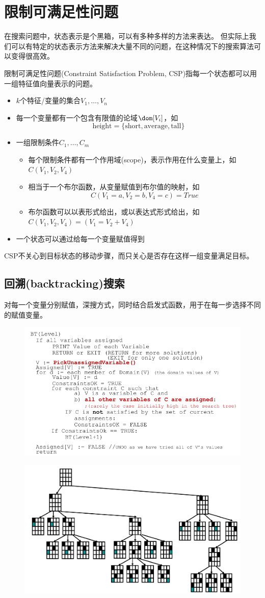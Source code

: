 
\section{限制可满足性问题}
在搜索问题中，状态表示是个黑箱，可以有多种多样的方法来表达。
但实际上我们可以有特定的状态表示方法来解决大量不同的问题，在这种情况下的搜索算法可以变得很高效。

限制可满足性问题(Constraint Satisfaction Problem, CSP)指每一个状态都可以用一组特征值向量表示的问题。
\begin{itemize}
	\item $k$个特征/变量的集合$V_1,\ldots,V_n$
	\item 每一个变量都有一个包含有限值的论域$\dom[V_i]$，如
	\[\text{height}=\{\text{short},\text{average},\text{tall}\}\]
	\item 一组限制条件$C_1,\ldots,C_m$
	\begin{itemize}
		\item 每个限制条件都有一个作用域(scope)，表示作用在什么变量上，如$C(V_1,V_2,V_4)$
		\item 相当于一个布尔函数，从变量赋值到布尔值的映射，如
		\[C(V_1=a,V_2=b,V_4=c)=True\]
		\item 布尔函数可以以表形式给出，或以表达式形式给出，如$C(V_1,V_2,V_4)=(V_1=V_2+V_4)$
	\end{itemize}
	\item 一个状态可以通过给每一个变量赋值得到
\end{itemize}

CSP不关心到目标状态的移动步骤，而只关心是否存在这样一组变量满足目标。

\subsection{回溯(backtracking)搜索}
对每一个变量分别赋值，深搜方式，同时结合启发式函数，用于在每一步选择不同的赋值变量。
\begin{figure}[H]
\centering
\includegraphics[width=0.6\linewidth]{fig/backtracking.png}
\end{figure}
\begin{figure}[H]
\centering
\includegraphics[width=0.6\linewidth]{fig/backtracking_eg.png}
\end{figure}

